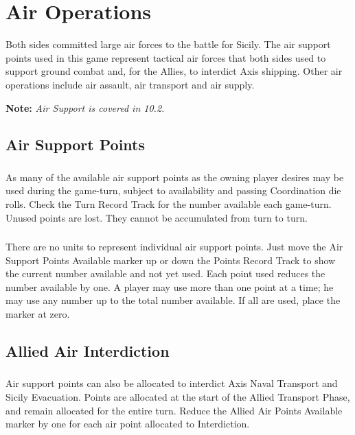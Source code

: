 \section{Air Operations}

Both sides committed large air forces to the battle for Sicily. The air support points used in this game represent tactical air forces that both sides used to support ground combat and, for the Allies, to interdict Axis shipping. Other air operations include air assault, air transport and air supply.

\textbf{Note:} \textit{Air Support is covered in 10.2.}

\subsection{Air Support Points}

\subsubsection{}
As many of the available air support points as the owning player desires may be used during the game-turn, subject to availability and passing Coordination die rolls. Check the Turn Record Track for the number available each game-turn. Unused points are lost. They cannot be accumulated from turn to turn.

\subsubsection{}
There are no units to represent individual air support points. Just move the Air Support Points Available marker up or down the Points Record Track to show the current number available and not yet used. Each point used reduces the number available by one. A player may use more than one point at a time; he may use any number up to the total number available. If all are used, place the marker at zero.

\subsection{Allied Air Interdiction}

\subsubsection{}
Air support points can also be allocated to interdict Axis Naval Transport and Sicily Evacuation. Points are allocated at the start of the Allied Transport Phase, and remain allocated for the entire turn. Reduce the Allied Air Points Available marker by one for each air point allocated to Interdiction.


